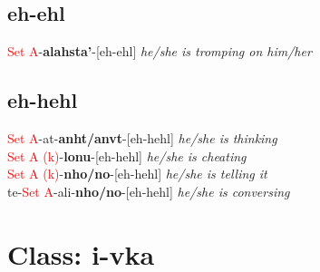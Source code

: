 \documentclass[oneside,openany]{book}%
\begin{document}
\subsection*{eh-ehl}%
\textcolor{Red}{Set A}{-}\textbf{alahsta'}{-}[eh-ehl] \textit{ he/she is tromping on him/her} \\%
\vspace{1em}%
\needspace{1in}%
\subsection*{eh-hehl}%
\textcolor{Red}{Set A}{-}at{-}\textbf{anht/anvt}{-}[eh-hehl] \textit{ he/she is thinking} \\%
\textcolor{Red}{Set A (k)}{-}\textbf{lonu}{-}[eh-hehl] \textit{ he/she is cheating} \\%
\textcolor{Red}{Set A (k)}{-}\textbf{nho/no}{-}[eh-hehl] \textit{ he/she is telling it} \\%
te{-}\textcolor{Red}{Set A}{-}ali{-}\textbf{nho/no}{-}[eh-hehl] \textit{ he/she is conversing} \\%
\vspace{1em}%
\needspace{3in}%
\section*{Class: i-vka}%
%
\needspace{1in}%
\end{document}
